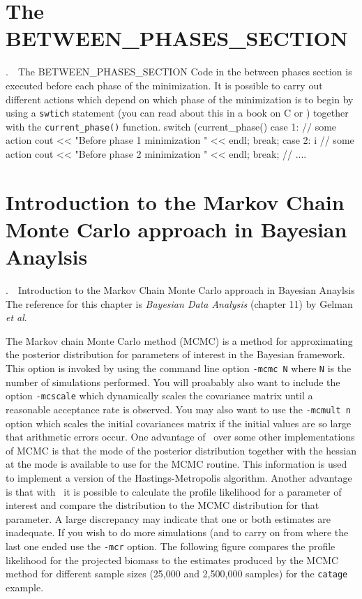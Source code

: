 \documentclass[12pt]{book}
\makeatletter
\def\mysection#1{\section{#1}{\bigbf \medbreak\noindent\number\c@chapter.\number\c@section\ \ #1\medbreak}}
\makeatother
\begin{document}
\mysection{The BETWEEN\_PHASES\_SECTION}
Code  in the between phases section is executed before each phase of the
minimization. It is possible to carry out different actions which depend
on which phase of the minimization is to begin by using a {\tt swtich}
statement (you can read about this in a book on C or \cplus) 
together with the {\tt current\_phase()} function. 
\beginexample
switch (current_phase()
{
case 1:
  // some action
  cout << "Before phase 1 minimization " << endl;
  break;
case 2: i
  // some action
  cout << "Before phase 2 minimization " << endl;
  break;
// ....
}
\endexample
\endchapter
\htmlnewfile
\mysection{Introduction to the Markov Chain Monte Carlo approach in Bayesian Anaylsis}
The reference for this chapter is  
{\it Bayesian Data Analysis} (chapter 11) by Gelman {\it et al}.  

The Markov chain Monte Carlo method (MCMC) is a method for approximating the
posterior distribution for parameters of interest in the Bayesian framework.
This option is invoked by using the command line option {\tt -mcmc N}
where {\tt N} is the number of simulations performed. You will proabably also
want to include the option {\tt -mcscale} which dynamically scales the
covariance matrix until a reasonable acceptance rate is observed.
You may also want to use the {\tt -mcmult n} option which scales the initial
covariances matrix if the initial values are so large that arithmetic
errors occur.
One advantage of \ADM\ over some other implementations of MCMC is that
the mode of the posterior distribution  together with the hessian at
the mode is available to use for the MCMC routine. This information
is used to implement a version of the Hastings-Metropolis algorithm.
Another advantage is that
with \ADM\ it is possible to calculate the profile likelihood for a parameter
of interest and compare the distribution to the MCMC distribution for that
parameter. A large discrepancy may indicate that one or both estimates
are inadequate. If you wish to do more simulations (and to carry on from where
the last one ended use the {\tt -mcr} option. 
The following figure compares the profile likelihood for the projected
biomass
to the estimates produced by the MCMC method for different sample sizes 
(25,000 and 2,500,000 samples) for the {\tt catage} example.
\end{document}
